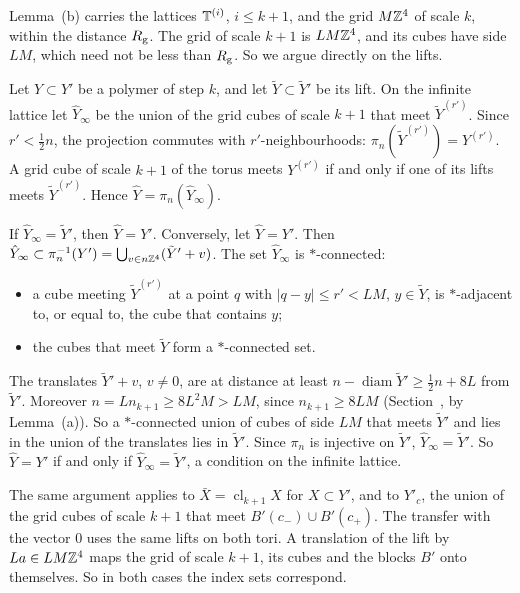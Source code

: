 \begin{step}
Lemma~(b) carries the lattices $\mathbb T^{(i)}$, $i\le k+1$, and the grid $M\mathbb Z^4$ of scale $k$, within the distance $R_{\rm g}$. The grid of scale $k+1$ is $LM\mathbb Z^4$, and its cubes have side $LM$, which need not be less than $R_{\rm g}$. So we argue directly on the lifts.

Let $Y\subset Y'$ be a polymer of step $k$, and let $\tilde Y\subset\tilde Y'$ be its lift. On the infinite lattice let $\hat Y_\infty$ be the union of the grid cubes of scale $k+1$ that meet $\tilde Y^{(r')}$. Since $r'<\frac12n$, the projection commutes with $r'$-neighbourhoods: $\pi_n(\tilde Y^{(r')})=Y^{(r')}$. A grid cube of scale $k+1$ of the torus meets $Y^{(r')}$ if and only if one of its lifts meets $\tilde Y^{(r')}$. Hence $\hat Y=\pi_n(\hat Y_\infty)$.

If $\hat Y_\infty=\tilde Y'$, then $\hat Y=Y'$. Conversely, let $\hat Y=Y'$. Then $\hat Y_\infty\subset\pi_n^{-1}(Y')=\bigcup_{v\in n\mathbb Z^4}(\tilde Y'+v)$. The set $\hat Y_\infty$ is $*$-connected:
\begin{itemize}
\item a cube meeting $\tilde Y^{(r')}$ at a point $q$ with $|q-y|\le r'<LM$, $y\in\tilde Y$, is $*$-adjacent to, or equal to, the cube that contains $y$;
\item the cubes that meet $\tilde Y$ form a $*$-connected set.
\end{itemize}
The translates $\tilde Y'+v$, $v\ne0$, are at distance at least $n-\operatorname{diam}\tilde Y'\ge\frac12n+8L$ from $\tilde Y'$. Moreover $n=Ln_{k+1}\ge8L^2M>LM$, since $n_{k+1}\ge8LM$ (Section~, by Lemma~(a)). So a $*$-connected union of cubes of side $LM$ that meets $\tilde Y'$ and lies in the union of the translates lies in $\tilde Y'$. Since $\pi_n$ is injective on $\tilde Y'$, $\hat Y_\infty=\tilde Y'$. So $\hat Y=Y'$ if and only if $\hat Y_\infty=\tilde Y'$, a condition on the infinite lattice.

The same argument applies to $\bar X=\operatorname{cl}_{k+1}X$ for $X\subset Y'$, and to $Y'_c$, the union of the grid cubes of scale $k+1$ that meet $B'(c_-)\cup B'(c_+)$. The transfer with the vector $0$ uses the same lifts on both tori. A translation of the lift by $La\in LM\mathbb Z^4$ maps the grid of scale $k+1$, its cubes and the blocks $B'$ onto themselves. So in both cases the index sets correspond.
\end{step}

